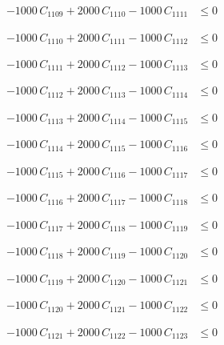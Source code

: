 \documentclass[a4paper,11pt]{article}
\begin{document}
\begin{align}
-1000\,C_{1109} + 2000\,C_{1110} - 1000\,C_{1111} &\leq 0 \nonumber
\end{align}

\begin{align}
-1000\,C_{1110} + 2000\,C_{1111} - 1000\,C_{1112} &\leq 0 \nonumber
\end{align}

\begin{align}
-1000\,C_{1111} + 2000\,C_{1112} - 1000\,C_{1113} &\leq 0 \nonumber
\end{align}

\begin{align}
-1000\,C_{1112} + 2000\,C_{1113} - 1000\,C_{1114} &\leq 0 \nonumber
\end{align}

\begin{align}
-1000\,C_{1113} + 2000\,C_{1114} - 1000\,C_{1115} &\leq 0 \nonumber
\end{align}

\begin{align}
-1000\,C_{1114} + 2000\,C_{1115} - 1000\,C_{1116} &\leq 0 \nonumber
\end{align}

\begin{align}
-1000\,C_{1115} + 2000\,C_{1116} - 1000\,C_{1117} &\leq 0 \nonumber
\end{align}

\begin{align}
-1000\,C_{1116} + 2000\,C_{1117} - 1000\,C_{1118} &\leq 0 \nonumber
\end{align}

\begin{align}
-1000\,C_{1117} + 2000\,C_{1118} - 1000\,C_{1119} &\leq 0 \nonumber
\end{align}

\begin{align}
-1000\,C_{1118} + 2000\,C_{1119} - 1000\,C_{1120} &\leq 0 \nonumber
\end{align}

\begin{align}
-1000\,C_{1119} + 2000\,C_{1120} - 1000\,C_{1121} &\leq 0 \nonumber
\end{align}

\begin{align}
-1000\,C_{1120} + 2000\,C_{1121} - 1000\,C_{1122} &\leq 0 \nonumber
\end{align}

\begin{align}
-1000\,C_{1121} + 2000\,C_{1122} - 1000\,C_{1123} &\leq 0 \nonumber
\end{align}
\end{document}

